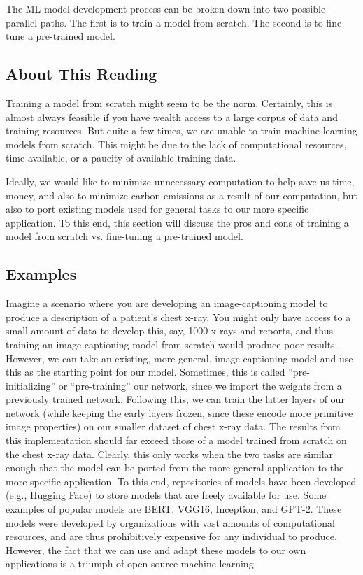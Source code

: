 {{{{     The ML model development process can be broken down into two possible parallel paths. The first is to train a model from scratch. The second is to fine-tune a pre-trained model.
     
     
     \subsection{About This Reading}
     
     Training a model from scratch might seem to be the norm. Certainly, this is almost always feasible if you have wealth access to a large corpus of data and training resources. But quite a few times, we are unable to train machine learning models from scratch. This might be due to the lack of computational resources, time available, or a paucity of available training data.
     
     Ideally, we would like to minimize unnecessary computation to help save us time, money, and also to minimize carbon emissions as a result of our computation, but also to port existing models used for general tasks to our more specific application. To this end, this section will discuss the pros and cons of training a model from scratch vs. fine-tuning a pre-trained model.
     
     \subsection{Examples}
     
     Imagine a scenario where you are developing an image-captioning model to produce a description of a patient’s chest x-ray. You might only have access to a small amount of data to develop this, say, 1000 x-rays and reports, and thus training an image captioning model from scratch would produce poor results. However, we can take an existing, more general, image-captioning model and use this as the starting point for our model. Sometimes, this is called “pre-initializing” or “pre-training” our network, since we import the weights from a previously trained network. Following this, we can train the latter layers of our network (while keeping the early layers frozen, since these encode more primitive image properties) on our smaller dataset of chest x-ray data. The results from this implementation should far exceed those of a model trained from scratch on the chest x-ray data. Clearly, this only works when the two tasks are similar enough that the model can be ported from the more general application to the more specific application. To this end, repositories of models have been developed (e.g., Hugging Face) to store models that are freely available for use. Some examples of popular models are BERT, VGG16, Inception, and GPT-2. These models were developed by organizations with vast amounts of computational resources, and are thus prohibitively expensive for any individual to produce. However, the fact that we can use and adapt these models to our own applications is a triumph of open-source machine learning.
 
}}}}

